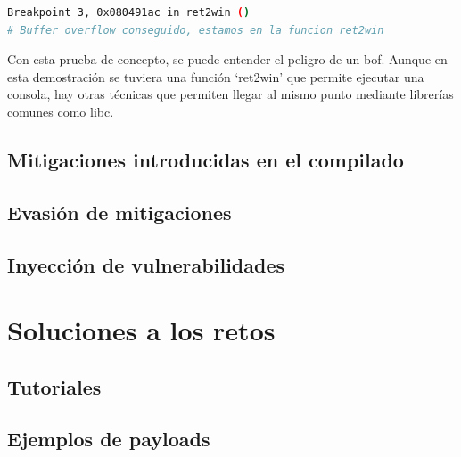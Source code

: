 \begin{lstlisting}[language=bash, caption=Explotación de GDB con binario ret2win]
Breakpoint 3, 0x080491ac in ret2win ()
# Buffer overflow conseguido, estamos en la funcion ret2win
\end{lstlisting}

Con esta prueba de concepto, se puede entender el peligro de un \acrshort{bof}.
Aunque en esta demostración se tuviera una función `ret2win' que permite ejecutar una consola, hay otras técnicas que permiten llegar al mismo punto mediante librerías comunes como \acrshort{libc}.

\subsection{Mitigaciones introducidas en el compilado} \label{subsec:mitigaciones}
\subsection{Evasión de mitigaciones}
\subsection{Inyección de vulnerabilidades} \label{subsec:vulns}
\section{Soluciones a los retos}
\subsection{Tutoriales}
\subsection{Ejemplos de payloads}